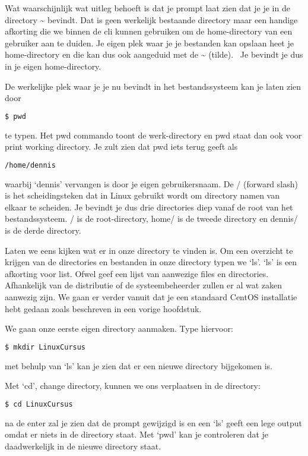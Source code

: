 Wat waarschijnlijk wat uitleg behoeft is dat je prompt laat zien dat je je in de directory \~{} bevindt. Dat is geen
werkelijk bestaande directory maar een handige afkorting die we binnen de cli kunnen gebruiken om de home-directory van
een gebruiker aan te duiden. Je eigen plek waar je je bestanden kan opslaan heet je home-directory en die kan dus ook
aangeduid met de \~{} (tilde). \ Je bevindt je dus in je eigen home-directory.

De werkelijke plek waar je je nu bevindt in het bestandssysteem kan je laten zien door
\begin{lstlisting}[language=bash]
$ pwd
\end{lstlisting}
te typen. Het pwd commando toont de werk-directory en pwd staat dan ook voor print working directory. Je zult zien dat
pwd iets terug geeft als
\begin{lstlisting}[language=bash]
/home/dennis
\end{lstlisting}
waarbij `dennis' vervangen is door je eigen gebruikersnaam. De / (forward slash) is het scheidingsteken dat in Linux
gebruikt wordt om directory namen van elkaar te scheiden. Je bevindt je dus drie directories diep vanaf de root van het
bestandssysteem. / is de root-directory, home/ is de tweede directory en dennis/ is de derde directory.

Laten we eens kijken wat er in onze directory te vinden is. Om een overzicht te krijgen van de directories en bestanden
in onze directory typen we `ls'. `ls' is een afkorting voor list. Ofwel geef een lijst van aanwezige files en
directories. Afhankelijk van de distributie of de systeembeheerder zullen er al wat zaken aanwezig zijn. We gaan er
verder vanuit dat je een standaard CentOS installatie hebt gedaan zoals beschreven in een vorige hoofdstuk.

We gaan onze eerste eigen directory aanmaken. Type hiervoor:
\begin{lstlisting}[language=bash]
$ mkdir LinuxCursus
\end{lstlisting}
met behulp van `ls' kan je zien dat er een nieuwe directory bijgekomen is.

Met `cd', change directory, kunnen we ons verplaatsen in de directory:
\begin{lstlisting}[language=bash]
$ cd LinuxCursus
\end{lstlisting}
na de enter zal je zien dat de prompt gewijzigd is en een `ls' geeft een lege output omdat er
niets in de directory staat. Met `pwd' kan je controleren dat je daadwerkelijk in de nieuwe directory staat.

